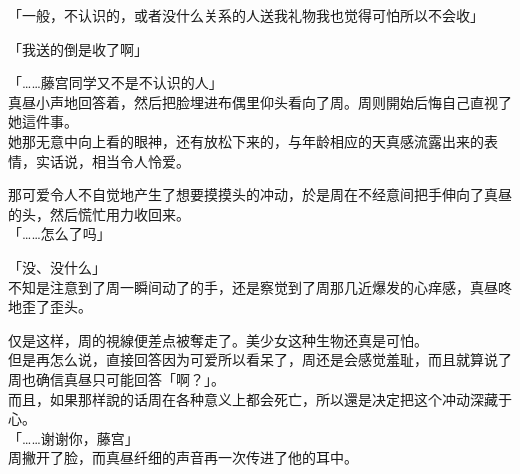 「一般，不认识的，或者没什么关系的人送我礼物我也觉得可怕所以不会收」

「我送的倒是收了啊」

「……藤宫同学又不是不认识的人」\\

真昼小声地回答着，然后把脸埋进布偶里仰头看向了周。周则開始后悔自己直视了她這件事。\\

她那无意中向上看的眼神，还有放松下来的，与年龄相应的天真感流露出来的表情，实话说，相当令人怜爱。

那可爱令人不自觉地产生了想要摸摸头的冲动，於是周在不经意间把手伸向了真昼的头，然后慌忙用力收回来。\\

「……怎么了吗」

「没、没什么」\\

不知是注意到了周一瞬间动了的手，还是察觉到了周那几近爆发的心痒感，真昼咚地歪了歪头。

仅是这样，周的視線便差点被奪走了。美少女这种生物还真是可怕。\\

但是再怎么说，直接回答因为可爱所以看呆了，周还是会感觉羞耻，而且就算说了周也确信真昼只可能回答「啊？」。\\

而且，如果那样說的话周在各种意义上都会死亡，所以還是决定把这个冲动深藏于心。\\

「……谢谢你，藤宫」\\

周撇开了脸，而真昼纤细的声音再一次传进了他的耳中。

